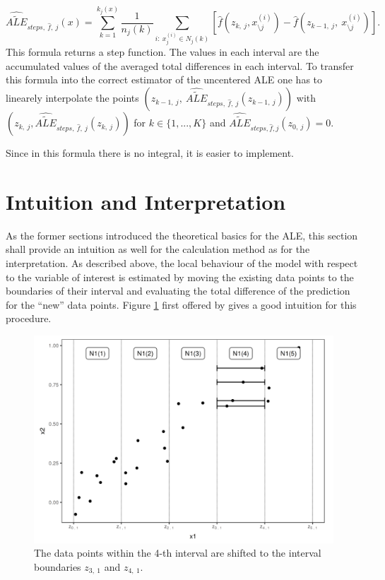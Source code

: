 \documentclass[
]{krantz}
\begin{document}
\[  \widehat{\widetilde{ALE}}_{steps,~\hat{f},~j}(x) =  \sum_{k=1}^{k_j(x)}   \frac{1}{n_j(k)}\sum_{i:~x_j^{(i)}\in N_j(k)} [\hat{f}(z_{k,~j}, x_{\setminus j}^{(i)})-\hat{f}(z_{k-1,~j},~x_{\setminus j}^{(i)})].  \]
This formula returns a step function. The values in each interval are the accumulated values of the averaged total differences in each interval. To transfer this formula into the correct estimator of the uncentered ALE one has to linearely interpolate the points \((z_{k-1,~j},~\widehat{\widetilde{ALE}}_{steps,~\hat{f},~j}(z_{k-1,~j}))\) with \(( z_{k,~j},\widehat{\widetilde{ALE}}_{steps,~ \hat{f},~j}(z_{k,~j}))\) for \(k \in \{1, ..., K \}\) and \(\widehat{\widetilde{ALE}}_{steps, \hat{f},j}(z_{0,~j}) = 0\).

Since in this formula there is no integral, it is easier to implement.

\hypertarget{intuition-and-interpretation}{%
\section{Intuition and Interpretation}\label{intuition-and-interpretation}}

As the former sections introduced the theoretical basics for the ALE, this section shall provide an intuition as well for the calculation method as for the interpretation. As described above, the local behaviour of the model with respect to the variable of interest is estimated by moving the existing data points to the boundaries of their interval and evaluating the total difference of the prediction for the ``new'' data points. Figure \ref{fig:dataALE} first offered by \citep{molnar2019} gives a good intuition for this procedure.

\begin{figure}
\includegraphics[width=1\linewidth]{images/ale_estimation_intuition} \caption{The data points within the 4-th interval are shifted to the interval boundaries \(z_{3,~1}\) and \(z_{4,~1}\).}\label{fig:dataALE}
\end{figure}
\end{document}
